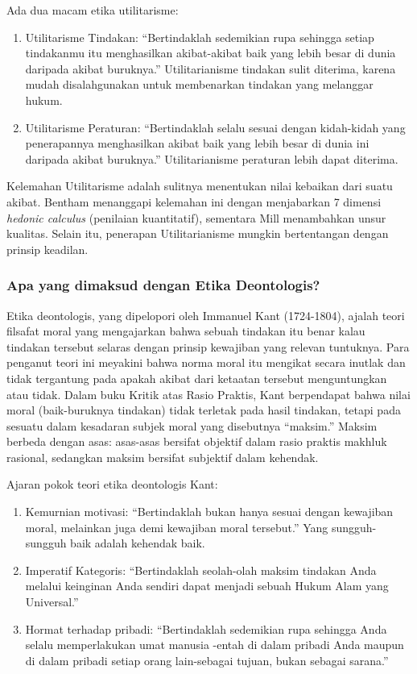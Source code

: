 \documentclass[11pt,twoside,a5paper,openany]{memoir}
\def\tightlist{}
\begin{document}
Ada dua macam etika utilitarisme:

\begin{enumerate}
\def\labelenumi{\arabic{enumi}.}
\tightlist
\item
  Utilitarisme Tindakan: ``Bertindaklah sedemikian rupa sehingga setiap
  tindakanmu itu menghasilkan akibat-akibat baik yang lebih besar di
  dunia daripada akibat buruknya.'' Utilitarianisme tindakan sulit
  diterima, karena mudah disalahgunakan untuk membenarkan tindakan yang
  melanggar hukum.
\item
  Utilitarisme Peraturan: ``Bertindaklah selalu sesuai dengan
  kidah-kidah yang penerapannya menghasilkan akibat baik yang lebih
  besar di dunia ini daripada akibat buruknya.'' Utilitarianisme
  peraturan lebih dapat diterima.
\end{enumerate}

Kelemahan Utilitarisme adalah sulitnya menentukan nilai kebaikan dari
suatu akibat. Bentham menanggapi kelemahan ini dengan menjabarkan 7
dimensi \emph{hedonic calculus} (penilaian kuantitatif), sementara Mill
menambahkan unsur kualitas. Selain itu, penerapan Utilitarianisme
mungkin bertentangan dengan prinsip keadilan.

\hypertarget{apa-yang-dimaksud-dengan-etika-deontologis}{%
\subsubsection{Apa yang dimaksud dengan Etika
Deontologis?}\label{apa-yang-dimaksud-dengan-etika-deontologis}}

Etika deontologis, yang dipelopori oleh Immanuel Kant (1724-1804),
ajalah teori filsafat moral yang mengajarkan bahwa sebuah tindakan itu
benar kalau tindakan tersebut selaras dengan prinsip kewajiban yang
relevan tuntuknya. Para penganut teori ini meyakini bahwa norma moral
itu mengikat secara inutlak dan tidak tergantung pada apakah akibat dari
ketaatan tersebut menguntungkan atau tidak. Dalam buku Kritik atas Rasio
Praktis, Kant berpendapat bahwa nilai moral (baik-buruknya tindakan)
tidak terletak pada hasil tindakan, tetapi pada sesuatu dalam kesadaran
subjek moral yang disebutnya ``maksim.'' Maksim berbeda dengan asas:
asas-asas bersifat objektif dalam rasio praktis makhluk rasional,
sedangkan maksim bersifat subjektif dalam kehendak.

Ajaran pokok teori etika deontologis Kant:

\begin{enumerate}
\def\labelenumi{\arabic{enumi}.}
\tightlist
\item
  Kemurnian motivasi: ``Bertindaklah bukan hanya sesuai dengan kewajiban
  moral, melainkan juga demi kewajiban moral tersebut.'' Yang
  sungguh-sungguh baik adalah kehendak baik.
\item
  Imperatif Kategoris: ``Bertindaklah seolah-olah maksim tindakan Anda
  melalui keinginan Anda sendiri dapat menjadi sebuah Hukum Alam yang
  Universal.''
\item
  Hormat terhadap pribadi: ``Bertindaklah sedemikian rupa sehingga Anda
  selalu memperlakukan umat manusia -entah di dalam pribadi Anda maupun
  di dalam pribadi setiap orang lain-sebagai tujuan, bukan sebagai
  sarana.''
\end{enumerate}
\end{document}
